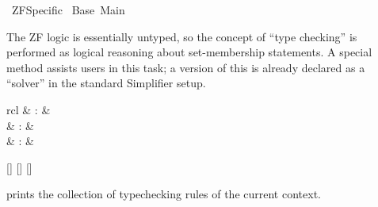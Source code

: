 %
\begin{isabellebody}%
\def\isabellecontext{ZF{\isaliteral{5F}{\isacharunderscore}}Specific}%
%
\isadelimtheory
%
\endisadelimtheory
%
\isatagtheory
{}\isamarkupfalse%
\ ZF{}Specific\isanewline
{}\ Base\ Main\isanewline
{}%
\endisatagtheory
{\isafoldtheory}%
%
\isadelimtheory
%
\endisadelimtheory
%
\isamarkuptrue%
%
\isamarkuptrue%
%
\begin{isamarkuptext}%
The ZF logic is essentially untyped, so the concept of ``type
  checking'' is performed as logical reasoning about set-membership
  statements.  A special method assists users in this task; a version
  of this is already declared as a ``solver'' in the standard
  Simplifier setup.

  \begin{matharray}{rcl}
    \hypertarget{command.ZF.print-tcset}{\hyperlink{command.ZF.print-tcset}{\mbox{}}} & : &  \\
    \hypertarget{method.ZF.typecheck}{\hyperlink{method.ZF.typecheck}{\mbox{}}} & : &  \\
    \hypertarget{attribute.ZF.TC}{\hyperlink{attribute.ZF.TC}{\mbox{}}} & : &  \\
  \end{matharray}

  \begin{railoutput}
[]
\rail@bar
{}
[]
[]
\rail@endbar
\rail@end
\end{railoutput}


  \begin{description}
  
  \item \hyperlink{command.ZF.print-tcset}{\mbox{}} prints the collection of
  typechecking rules of the current context.
  

\end{description}
\end{isamarkuptext}
\end{isabellebody}
